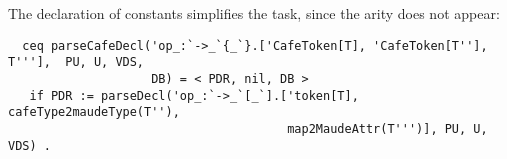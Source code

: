 {\codesize
\begin{comment}
  ceq parseCafeDecl('op_:_->_`{_`}.['__[TL], T', 'CafeToken[T''], T'''],  PU, U, VDS,
                    DB) = < PDR, nil, DB >
   if T4 := addSortToken(T') /\
      PDR := parseDecl('op_:_->_`[_`].['token[upTerm(tokenList2token(TL))], T4,
                       'sortToken[T''], map2MaudeAttr(T''')], PU, U, VDS) .
\end{verbatim}
}

{\codesize
\begin{comment}
  ceq parseCafeDecl('op_:_->_.['CafeToken[T], T', 'CafeToken[T'']],  PU, U, VDS, DB) =
                                                                          < PDR, nil, DB >
   if T4 := addSortToken(T') /\
      PDR := parseDecl('op_:_->_.['token[T], T4, cafeType2maudeType(T'')], PU, U, VDS) .

  ceq parseCafeDecl('op_:_->_.['__[TL], T', 'CafeToken[T'']],  PU, U, VDS, DB) =
                                                                          < PDR, nil, DB >
   if T4 := addSortToken(T') /\
      PDR := parseDecl('op_:_->_.['token[upTerm(tokenList2token(TL))], T4,
                                                cafeType2maudeType(T'')], PU, U, VDS) .
\end{comment}
}

The declaration of constants simplifies the task, since the arity does not appear:

{\codesize
\begin{verbatim}
  ceq parseCafeDecl('op_:`->_`{_`}.['CafeToken[T], 'CafeToken[T''], T'''],  PU, U, VDS,
                    DB) = < PDR, nil, DB >
   if PDR := parseDecl('op_:`->_`[_`].['token[T], cafeType2maudeType(T''),
                                       map2MaudeAttr(T''')], PU, U, VDS) .
\end{verbatim}
}

{\codesize
\begin{comment}
  ceq parseCafeDecl('op_:`->_.['CafeToken[T], 'CafeToken[T'']],  PU, U, VDS, DB) =
                                                                          < PDR, nil, DB >
   if PDR := parseDecl('op_:`->_.['token[T], cafeType2maudeType(T'')], PU, U, VDS) .

  ceq parseCafeDecl('ops_:_->_`{_`}.['neCafeTokenList[T], T', 'CafeToken[T''], T'''], PU,
                    U, VDS, DB) = < PDR, nil, DB >
   if T4 := addSortToken(T') /\
      PDR := parseDecl('ops_:_->_`[_`].['neTokenList[T], T4, cafeType2maudeType(T''),
                                        map2MaudeAttr(T''')], PU, U, VDS) .
\end{comment}
}

